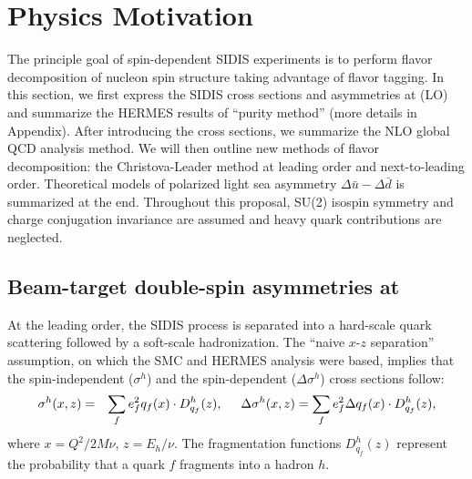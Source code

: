 \section{Physics Motivation}
The principle goal of spin-dependent SIDIS experiments is to perform flavor 
decomposition of nucleon spin structure taking advantage of flavor tagging. 
In this section, we first express the SIDIS cross sections and asymmetries at 
\lo (LO) and summarize the HERMES results of ``purity method'' (more details
 in Appendix). After introducing the \nlo cross sections, we 
 summarize the NLO global QCD analysis method. 
We will then outline new methods of flavor decomposition:
the Christova-Leader method at leading order and next-to-leading order.
Theoretical models
of polarized light sea asymmetry $\Delta \bar{u}-\Delta \bar{d}$ is summarized at the end.
Throughout this proposal, SU(2) isospin symmetry and charge conjugation invariance are  
assumed and heavy quark contributions are neglected.

\subsection{Beam-target double-spin asymmetries at \lo}
 At the leading order, the 
 SIDIS process is separated into a hard-scale quark scattering 
 followed by a soft-scale hadronization.
 The ``naive $x$-$z$ separation'' assumption, on which the SMC and HERMES
analysis were based, implies that the spin-independent 
($\sigma^{h}$)
and the spin-dependent ($\Delta \sigma^{h}$)
  cross sections follow: 
\begin{eqnarray}  
 \sigma^{h} (x,z) & = & \sum_{f} e_f^2 q_f(x) \cdot D_{q_f}^{h}(z),  \hspace{0.5cm}
 \Delta \sigma^{h} (x,z)  =  \sum_{f} e_f^2 \Delta q_f(x) \cdot D_{q_f}^{h}(z),  
\label{eq:fact}  
\end{eqnarray}  
where $x=Q^2/2M\nu$, $z=E_h/\nu$.
 The fragmentation functions $D_{q_f}^{h}(z)$ represent the probability that a quark
 $f$ fragments into a hadron $h$.  

